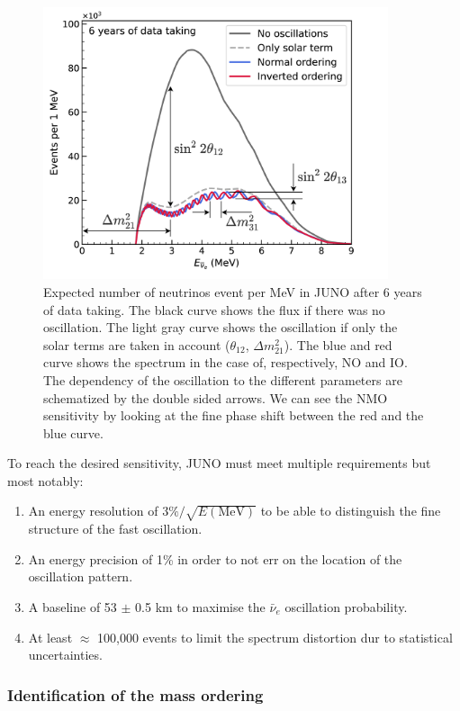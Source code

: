 \begin{figure}
  \centering
  \includegraphics[height=8cm]{images/juno/Spectrum-OscillationsOnly_dm2_31.png}
  \caption{Expected number of neutrinos event per MeV in JUNO after 6 years of data taking. The black curve shows the flux if there was no oscillation. The light gray curve shows the oscillation if only the solar terms are taken in account ($\theta_{12}$, $\Delta m_{21}^2$). The blue and red curve shows the spectrum in the case of, respectively, NO and IO. The dependency of the oscillation to the different parameters are schematized by the double sided arrows. We can see the NMO sensitivity by looking at the fine phase shift between the red and the blue curve.}
  \label{fig:juno-spectrum-oscillation}
\end{figure}

To reach the desired sensitivity, JUNO must meet multiple requirements but most notably:
\begin{enumerate}
  \item An energy resolution of $3\%/\sqrt{E\mathrm{(MeV)}}$ to be able to distinguish the fine structure of the fast oscillation.
  \item An energy precision of 1\% in order to not err on the location of the oscillation pattern.
  \item A baseline of 53 $\pm$ 0.5 km to maximise the $\bar{\nu}_e$ oscillation probability.
  \item At least $\approx$ 100,000 events to limit the spectrum distortion dur to statistical uncertainties.
\end{enumerate}

\subsubsection{Identification of the mass ordering}

